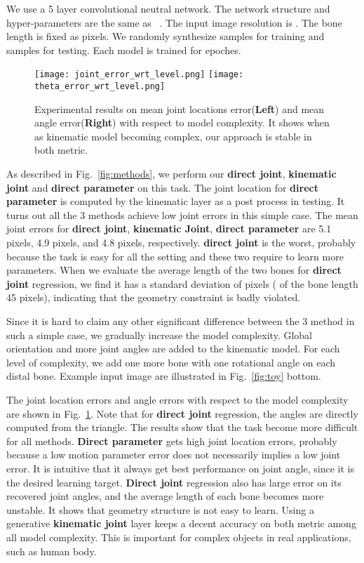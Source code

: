 \documentclass[runningheads]{llncs}
\begin{document}
We use a 5 layer convolutional neutral network. The network structure and hyper-parameters are the same as ~\cite{zhou2016model}. The input image resolution is . The bone length is fixed as  pixels. We randomly synthesize  samples for training and  samples for testing. Each model is trained for  epoches.

\begin{figure}
\begin{center}
\texttt{[image: joint\_error\_wrt\_level.png]}
\texttt{[image: theta\_error\_wrt\_level.png]}
\end{center}
   \caption{Experimental results on mean joint locations error(\textbf{Left}) and mean angle error(\textbf{Right}) with respect to model complexity. It shows when as kinematic model becoming complex, our approach is stable in both metric.}
\label{fig:toycomp}
\end{figure}

As described in Fig.~\ref{fig:methods}, we perform our \textbf{direct joint}, \textbf{kinematic joint} and \textbf{direct parameter} on this task. The joint location for \textbf{direct parameter} is computed by the kinematic layer as a post process in testing. It turns out all the 3 methods achieve low joint errors in this simple case. The mean joint errors for \textbf{direct joint}, \textbf{kinematic Joint}, \textbf{direct parameter} are 5.1 pixels, 4.9 pixels, and 4.8 pixels, respectively.
\textbf{direct joint} is the worst, probably because the task is easy for all the setting and these two require to learn more parameters. When we evaluate the average length of the two bones for \textbf{direct joint} regression, we find it has a standard deviation of  pixels ( of the bone length 45 pixels), indicating that the geometry constraint is badly violated.



Since it is hard to claim any other significant difference between the 3 method in such a simple case, we gradually increase the model complexity. Global orientation and more joint angles are added to the kinematic model. For each level of complexity, we add one more bone with one rotational angle on each distal bone. Example input image are illustrated in Fig.~\ref{fig:toy} bottom.

The joint location errors and angle errors with respect to the model complexity are shown in Fig.~\ref{fig:toycomp}. Note that for \textbf{direct joint} regression, the angles are directly computed from the triangle. The results show that the task become more difficult for all methods.
\textbf{Direct parameter} gets high joint location errors, probably because a low motion parameter error does not necessarily implies a low joint error. It is intuitive that it always get best performance on joint angle, since it is the desired learning target.
\textbf{Direct joint} regression also has large error on its recovered joint angles, and the average length of each bone becomes more unstable. It shows that geometry structure is not easy to learn. Using a generative \textbf{kinematic joint} layer keeps a decent accuracy on both metric among all model complexity. This is important for complex objects in real applications, such as human body.
\end{document}
